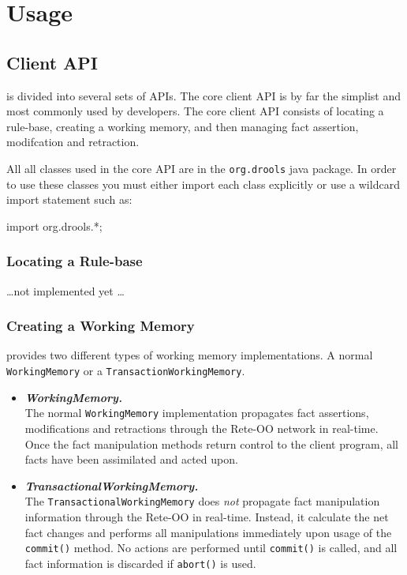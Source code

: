 \chapter{Usage}

\section{\drools{} Client API}

\drools{} is divided into several sets of APIs.  The core client API
is by far the simplist and most commonly used by developers.  The
core \drools{} client API consists of locating a rule-base, creating
a working memory, and then managing fact assertion, modifcation and
retraction.

All all classes used in the core \drools{} API are in the
\verb|org.drools| java package.  In order to use these classes
you must either import each class explicitly or use a wildcard
import statement such as:

\bigskip
\begin{codelisting}
import org.drools.*;
\end{codelisting}

\subsection{Locating a Rule-base}

\dots not implemented yet \dots

\subsection{Creating a Working Memory}

\drools{} provides two different types of working memory
implementations.  A normal \verb|WorkingMemory| or a
\verb|TransactionWorkingMemory|.

\begin{itemize}

	\item \emph{\textbf{WorkingMemory.}} \\
		The normal \verb|WorkingMemory| implementation 
		propagates fact assertions, modifications and
		retractions through the Rete-OO network in
		real-time.  Once the fact manipulation 
		methods return control to the client program,
		all facts have been assimilated and acted upon.

	\item \emph{\textbf{TransactionalWorkingMemory.}} \\
		The \verb|TransactionalWorkingMemory| does \emph{not}
		propagate fact manipulation information through the
		Rete-OO in real-time.  Instead, it calculate the net
		fact changes and performs all manipulations immediately
		upon usage of the \verb|commit()| method.  No actions
		are performed until \verb|commit()| is called, and
		all fact information is discarded if \verb|abort()|
		is used.

\end{itemize}

